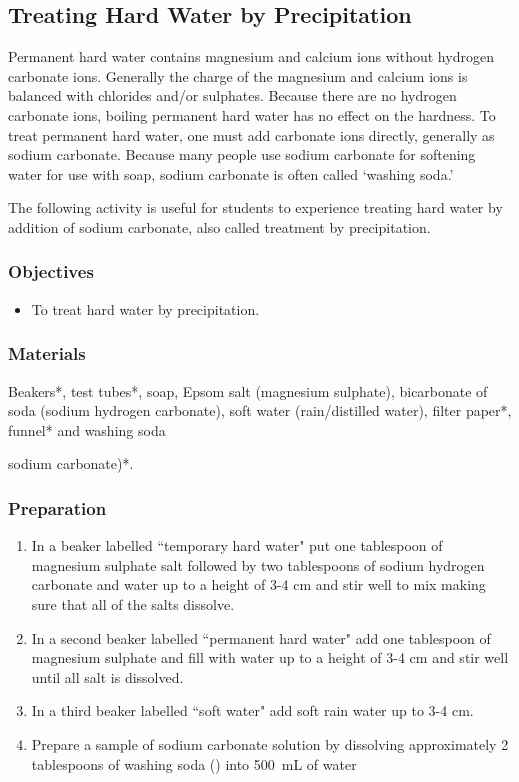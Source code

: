 {\subsection{Treating Hard Water by Precipitation}

Permanent hard water contains magnesium and calcium ions without hydrogen carbonate ions. Generally the charge of the magnesium and calcium ions is balanced with chlorides and/or sulphates. Because there are no hydrogen carbonate ions, boiling permanent hard water has no effect on the hardness. To treat permanent hard water, one must add carbonate ions directly, generally as sodium carbonate. Because many people use sodium carbonate for softening water for use with soap, sodium carbonate is often called `washing soda.'

The following activity is useful for students to experience treating hard water by addition of sodium carbonate, also called treatment by precipitation.

\subsubsection*{Objectives}
\begin{itemize}
\item{To treat hard water by precipitation.}
\end{itemize}

\subsubsection*{Materials}
Beakers*, test tubes*, soap, Epsom salt (magnesium sulphate), bicarbonate of soda (sodium hydrogen carbonate), soft water (rain/distilled water), filter paper*, funnel* and washing soda {sodium carbonate)*.

\subsubsection*{Preparation}
\begin{enumerate}
\item{In a beaker labelled ``temporary hard water" put one tablespoon of magnesium sulphate salt followed by two tablespoons  of sodium hydrogen carbonate and water up to a height of 3-4 cm and stir well to mix making sure that all of the salts dissolve.}
\item{In a second beaker labelled ``permanent hard water" add one tablespoon of magnesium sulphate and fill with water up to a height of 3-4 cm and stir well until all salt is dissolved.}
\item{In a third beaker labelled ``soft water"  add soft rain water up to 3-4 cm.}
\item{Prepare a sample of sodium carbonate solution by dissolving approximately 2 tablespoons of washing soda () into 500~mL of water}
\end{enumerate}

}}
